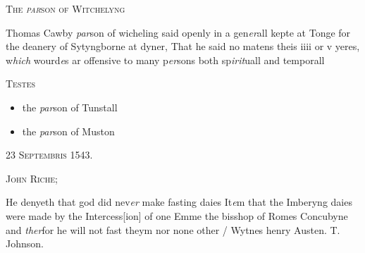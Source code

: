 \documentclass[12pt, a4paper]{book}
\begin{document}
               
               	
				\begin{center}  {\scshape The \textit{par}son of Witchelyng}  \end{center}
			
               	
		\ifthenelse{\isodd{\thepage}}
		{\reversemarginpar}
		{\normalmarginpar}
		Thomas Cawby \textit{par}son of wicheling said openly
 in a gen\textit{er}all kepte at Tonge for the deanery of
 Sytyngborne at dyner, That he said no matens
 theis iiii or v yeres, w\textit{hich} wourd\textit{e}s ar offensive to
 many p\textit{er}sons both sp\textit{irit}uall and temporall
\begin{center} {\scshape Testes} \end{center}\begin{itemize}
	
	\item[]the \textit{par}son of Tunstall
	\item[]the \textit{par}son of Muston
\end{itemize}
 

            
            
               
				\begin{center} \begin{large} {\scshape 
                  23 Septembris 1543.} \end{large} \end{center}
			
               
                  
				\begin{center}  {\scshape John Riche;}  \end{center}
			

	
				\marginpar[\vspace{0.5cm}{\textcolor{Gray}{ fastynge dayes}}]{}
			
	
		\ifthenelse{\isodd{\thepage}}
		{\reversemarginpar}
		{\normalmarginpar}
		He denyeth that god did nev\textit{er} make fasting daies
 It\textit{e}m that the Imberyng daies were made by the Intercess[ion]
 of one Emme the bisshop of Romes Concubyne and \textit{ther}for
 he will not fast theym nor none other / Wytnes henry
 Austen. T. Johnson.


               

\dotfill
						\newpage {} \subsection*{}  \subsection*{}  \subsection*{}
\end{document}

